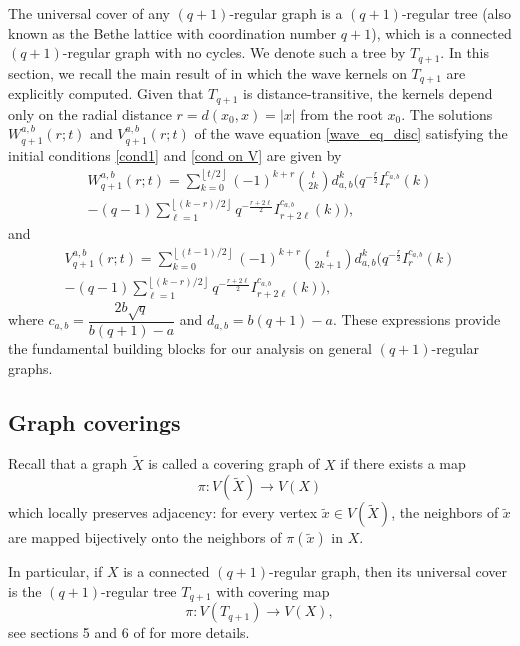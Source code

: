 \documentclass[reqno,10pt]{amsart}
\theoremstyle{definition}
\numberwithin{equation}{section}
\begin{document}
The universal cover of any $(q+1)$-regular graph is a $(q+1)$-regular tree (also known as the Bethe lattice with coordination number $q+1$), which is a connected $(q+1)$-regular graph with no cycles. We denote such a tree by $T_{q+1}$.
In this section, we recall the main result of \cite{BSS26} in which the wave kernels on 
$T_{q+1}$ are explicitly computed. Given that $T_{q+1}$ is distance-transitive, the kernels depend only on the radial distance $r=d(x_0,x)=|x|$ from the root $x_0$. The solutions $W_{q+1}^{a,b}(r;t)$ and $V_{q+1}^{a,b}(r;t)$ of the wave equation \eqref{wave_eq_disc} satisfying the initial conditions \eqref{cond1} and \eqref{cond on V} are given by
\begin{multline}\label{eq:tree_W}
W_{q+1}^{a,b}(r;t)
=\sum_{k=0}^{\left\lfloor t/2 \right\rfloor}
(-1)^{k+r}\binom{t}{2k} d_{a,b}^k
\bigg(
q^{-\frac{r}{2}} I_r^{c_{a,b}}(k)\\
-(q-1)\sum_{\ell=1}^{\left\lfloor (k-r)/2 \right\rfloor}
q^{-\frac{r+2\ell}{2}} I_{r+2\ell}^{c_{a,b}}(k)
\bigg),
\end{multline}
and
\begin{multline*}\label{eq:tree_V}
V_{q+1}^{a,b}(r;t)
=\sum_{k=0}^{\left\lfloor (t-1)/2 \right\rfloor}
(-1)^{k+r}\binom{t}{2k+1} d_{a,b}^k
\bigg(
q^{-\frac{r}{2}} I_r^{c_{a,b}}(k)\\
-(q-1)\sum_{\ell=1}^{\left\lfloor (k-r)/2 \right\rfloor}
q^{-\frac{r+2\ell}{2}} I_{r+2\ell}^{c_{a,b}}(k)
\bigg),
\end{multline*}
where $c_{a,b} = \dfrac{2b\sqrt{q}}{b(q+1) - a}$ and $d_{a,b}=b(q+1)-a$. These expressions provide the fundamental building blocks for our analysis on general $(q+1)$-regular graphs.

\subsection{Graph coverings}

Recall that a graph $\widetilde X$ is called a covering graph of $X$ if there exists a map
\[
\pi:V(\widetilde X)\to V(X)
\]
which locally preserves adjacency: for every vertex $\widetilde x\in V(\widetilde X)$, the neighbors of $\widetilde x$ are mapped bijectively onto the neighbors of $\pi(\widetilde x)$ in $X$. 

In particular, if $X$ is a connected $(q+1)$-regular graph, then its universal cover is the $(q+1)$-regular tree $T_{q+1}$ with covering map
\[
\pi:V(T_{q+1})\to V(X),
\]
see sections 5 and 6 of \cite{CY99} for more details. 
\end{document}

